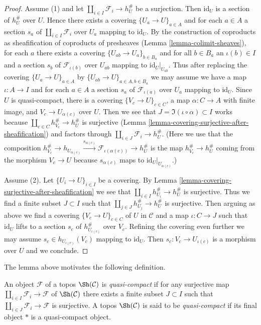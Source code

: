 \begin{proof}
Assume (1) and let $\coprod_{i \in I} \mathcal{F}_i \to h_U^\#$
be a surjection. Then $\text{id}_U$ is a section of
$h_U^\#$ over $U$. Hence there exists a covering
$\{U_a \to U\}_{a \in A}$ and for each $a \in A$
a section $s_a$ of $\coprod_{i \in I} \mathcal{F}_i$
over $U_a$ mapping to $\text{id}_U$. By the construction of coproducts as
sheafification of coproducts of presheaves
(Lemma \ref{lemma-colimit-sheaves}), for each $a$
there exists a covering $\{U_{ab} \to U_a\}_{b \in B_a}$ and
for all $b \in B_a$ an $\iota(b) \in I$ and a section
$s_{b}$ of $\mathcal{F}_{\iota(b)}$ over $U_{ab}$
mapping to $\text{id}_U|_{U_{ab}}$. Thus after replacing
the covering $\{U_a \to U\}_{a \in A}$ by
$\{U_{ab} \to U\}_{a \in A, b \in B_a}$
we may assume we have a map $\iota : A \to I$
and for each $a \in A$ a section $s_a$ of $\mathcal{F}_{\iota(a)}$
over $U_a$ mapping to $\text{id}_U$.
Since $U$ is quasi-compact, there is a covering
$\{V_c \to U\}_{c \in C}$, a map $\alpha : C \to A$
with finite image, and $V_c \to U_{\alpha(c)}$ over $U$.
Then we see that $J = \Im(\iota \circ \alpha) \subset I$ works
because $\coprod_{c \in C} h_{V_c}^\# \to h_U^\#$ is surjective
(Lemma \ref{lemma-covering-surjective-after-sheafification})
and factors through $\coprod_{i \in J} \mathcal{F}_i \to h_U^\#$.
(Here we use that the composition
$h_{V_c}^\# \to h_{U_{\alpha(c)}}
\xrightarrow{s_{\alpha(c)}} \mathcal{F}_{\iota(\alpha(c))} \to h_U^\#$
is the map $h_{V_c}^\# \to h_U^\#$ coming from the morphism
$V_c \to U$ because $s_{\alpha(c)}$ maps to $\text{id}_U|_{U_{\alpha(c)}}$.)

\medskip\noindent
Assume (2). Let $\{U_i \to U\}_{i \in I}$ be a covering.
By Lemma \ref{lemma-covering-surjective-after-sheafification}
we see that $\coprod_{i \in I} h_{U_i}^\# \to h_U^\#$ is surjective.
Thus we find a finite subset $J \subset I$ such that
$\coprod_{j \in J} h_{U_j}^\# \to h_U^\#$ is surjective.
Then arguing as above we find a covering
$\{V_c \to U\}_{c \in C}$ of $U$ in $\mathcal{C}$
and a map $\iota : C \to J$
such that $\text{id}_U$ lifts to a section
$s_c$ of $h_{U_{\iota(c)}}^\#$ over $V_c$.
Refining the covering even further we may assume
$s_c \in h_{U_{\iota(c)}}(V_c)$ mapping to $\text{id}_U$.
Then $s_c : V_c \to U_{\iota(c)}$ is a morphism over $U$
and we conclude.
\end{proof}

\noindent
The lemma above motivates the following definition.

\begin{definition}
\label{definition-quasi-compact-topos}
An object $\mathcal{F}$ of a topos $\Sh(\mathcal{C})$ is {\it quasi-compact}
if for any surjective map $\coprod_{i \in I} \mathcal{F}_i \to \mathcal{F}$
of $\Sh(\mathcal{C})$ there exists a finite subset $J \subset I$ such
that $\coprod_{i \in J} \mathcal{F}_i \to \mathcal{F}$ is surjective.
A topos $\Sh(\mathcal{C})$ is said to be {\it quasi-compact}
if its final object $*$ is a quasi-compact object.
\end{definition}

